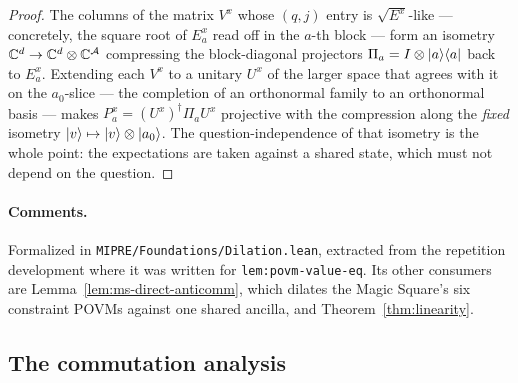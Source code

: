 \begin{proof}
\leanok
The columns of the matrix $V^x$ whose $(q, j)$ entry is $\sqrt{E^x}$-like --- concretely, the
square root of $E^x_a$ read off in the $a$-th block --- form an isometry $\mathbb{C}^d \to \mathbb{C}^d \otimes
\mathbb{C}^{\mathcal{A}}$ compressing the block-diagonal projectors $\Pi_a = I \otimes |a\rangle\langle a|$
back to $E^x_a$. Extending each $V^x$ to a unitary $U^x$ of the larger space that agrees with it on
the $a_0$-slice --- the completion of an orthonormal family to an orthonormal basis --- makes
$P^x_a = (U^x)^\dagger \Pi_a U^x$ projective with the compression along the
\emph{fixed} isometry $|v\rangle \mapsto |v\rangle \otimes |a_0\rangle$. The question-independence of that
isometry is the whole point: the expectations are taken against a shared state, which must not
depend on the question.
\end{proof}

\paragraph{Comments.} Formalized in \texttt{MIPRE/Foundations/Dilation.lean}, extracted from the
repetition development where it was written for \texttt{lem:povm-value-eq}. Its other consumers are
Lemma~\ref{lem:ms-direct-anticomm}, which dilates the Magic Square's six constraint POVMs against
one shared ancilla, and Theorem~\ref{thm:linearity}.

\subsection{The commutation analysis}

